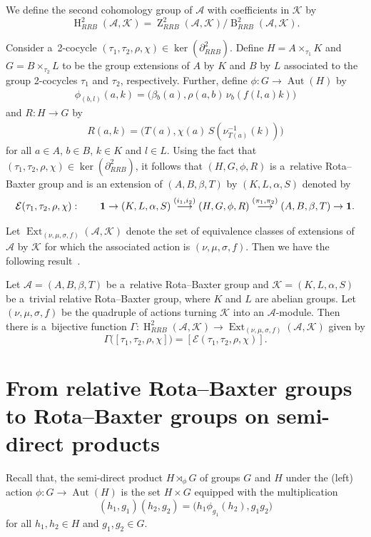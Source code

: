 \documentclass{jonasart}
\theoremstyle{plain}
\DeclareMathOperator{\Aut}{Aut}
\DeclareMathOperator{\B}{B}
\DeclareMathOperator{\Ext}{Ext}
\DeclareMathOperator{\Ho}{H}
\DeclareMathOperator{\Ker}{ker}
\DeclareMathOperator{\Z}{Z}
\begin{document}
	We define the second cohomology group of $\mathcal{A}$ with coefficients in $\mathcal{K}$ by
	\[
	\Ho^2_{RRB}(\mathcal{A}, \mathcal{K})=\Z^2_{RRB}(\mathcal{A}, \mathcal{K})/  \B^2_{RRB}(\mathcal{A}, \mathcal{K}).
	\]
	
	Consider a~2-cocycle $(\tau_1, \tau_2, \rho, \chi) \in \Ker(\partial_{RRB}^2)$. Define $H=A\times_{\tau_1} K$ and $G= B \times_{\tau_2} L$ to be the group extensions of $A$ by $K$ and $B$ by $L$ associated to the group 2-cocycles $\tau_1$ and $\tau_2$, respectively. Further, define $\phi: G \rightarrow \Aut(H)$ by
	\begin{align}
		\phi_{(b,l)}(a,k)=\big(\beta{_{b}(a)}, \rho(a,b) \,\nu_b (f(l,a)k)\big)
	\end{align}
	and $R: H \rightarrow G$ by
	\begin{align}
		R(a,k)=\big(T(a), \chi(a)\,S(\nu^{-1}_{T(a)}(k))\big)
	\end{align}
	for all $a \in A$, $b \in B$, $k \in K$ and $l \in L$. Using the fact that $(\tau_1, \tau_2, \rho, \chi) \in \Ker(\partial_{RRB}^2 )$, it follows that $(H, G, \phi, R)$ is a~relative Rota--Baxter group and is an extension of $(A,B, \beta, T)$ by $(K,L, \alpha, S)$ denoted by
	\[
	\mathcal{E}(\tau_1, \tau_2, \rho, \chi) : \quad \quad {\bf 1} \to (K,L, \alpha,S ) \stackrel{(i_1, i_2)}{\longrightarrow}  (H, G, \phi, R) \stackrel{(\pi_1, \pi_2)}{\longrightarrow} (A,B, \beta, T) \to {\bf 1}.
	\]
	
	Let $\Ext_{(\nu, \mu, \sigma, f)}(\mathcal{A}, \mathcal{K})$ denote the set of equivalence classes of extensions of $\mathcal{A}$ by $\mathcal{K}$ for which the associated action is $(\nu, \mu, \sigma, f)$. Then we have the following result~\cite[Theorem~3.18]{MR4819014}.
	
	\begin{theorem}\label{ext and cohom bijection}
		Let $\mathcal{A}= (A,B, \beta, T)$ be a~relative Rota--Baxter group and $\mathcal{K}= (K,L,\alpha,S )$ be a~trivial relative Rota--Baxter group, where $K$ and $L$ are abelian groups. Let $(\nu, \mu, \sigma, f)$ be the quadruple of actions turning $\mathcal{K}$ into an $\mathcal{A}$-module. Then there is a~bijective function $\Gamma : \Ho^2_{RRB}(\mathcal{A},\mathcal{K})\to \Ext_{(\nu,\mu,\sigma,f)}(\mathcal{A},\mathcal{K})$ given by
		\[
		\Gamma \big([\tau_1, \tau_2, \rho, \chi] \big)=[\mathcal{E}(\tau_1, \tau_2, \rho, \chi)].
		\]
	\end{theorem}
	
	\section[From relative RB groups to RB groups on semi-direct products]{From relative Rota--Baxter groups to Rota--Baxter groups on semi-direct products}\label{section RRB to RRB on SDP}
	Recall that, the semi-direct product $H\rtimes_{\phi} G$ of groups $G$ and $H$ under the (left) action $\phi\colon G\rightarrow \Aut(H)$ is the set
	$H \times G$ equipped with the multiplication
	\[
	(h_1, g_1) (h_2, g_2) = \big(h_1 \phi_{g_1}(h_2), g_1 g_2 \big)
	\]
	for all $h_1, h_2 \in H$ and $g_1, g_2 \in G$.
	
\end{document}
